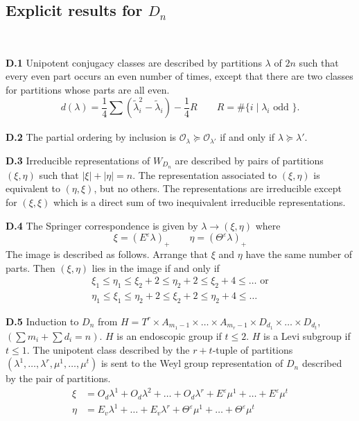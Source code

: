 \documentclass{amsart}
\newcommand\Amone[1]{A_{m_{#1}-1}}
\newcommand\eps	{\varepsilon}
\newcommand\lam	{\lambda}
\newcommand\lami	{\lam_i}
\newcommand\cO		{{\mathcal O}}
\newcommand\sumlam[1]{\sum_{#1} (\tilde\lam_i^2 - \tilde\lambda_i)}
\begin{document}

\bigskip
\subsection{Explicit results for $D_n$}~\newline

\bigskip

\noindent
{\bf D.1} \qquad Unipotent conjugacy classes are described by partitions $\lam$ of $2n$ such
that every even part occurs an even number of times, except that there are
two classes for partitions whose parts are all even.
	$$
	d(\lam) = \frac 14 \sumlam{} - \frac 14 R \qquad
	R = \#\{ i \mid \lami \text{ odd } \}.
	$$

\noindent
{\bf D.2} \qquad The partial ordering by inclusion is 
$\cO_\lam \succeq \cO_{\lam'}$ if and only if $\lam \succeq \lam'$.

\noindent
{\bf D.3} \qquad Irreducible representations of $W_{D_n}$ are described by pairs of partitions
$(\xi,\eta)$ such that $|\xi| + |\eta| = n$.  The representation associated
to $(\xi,\eta)$ is equivalent to $(\eta,\xi)$, but no others.  The
representations are irreducible except for $(\xi,\xi)$ which is a direct
sum of two inequivalent irreducible representations.

\noindent
{\bf D.4} \qquad The Springer correspondence is given by $\lam \to (\xi,\eta)$
where
	$$
	\xi = (E^\eps\lam)_+ \qquad
	\eta = (\Theta^\eps\lam)_+
	$$
The image is described as follows.  Arrange that
$\xi$ and $\eta$ have the same number of parts.  Then $(\xi,\eta)$ lies in the
image if and only if
	\begin{gather*}
	\xi_1 \le \eta_1 \le \xi_2+2 \le \eta_2+2 
		\le \xi_2+4 \le \dots \text{ or} \\
	\eta_1 \le \xi_1 \le \eta_2+2 \le \xi_2+2 \le \eta_2+4 \le \dots
	\end{gather*}

\noindent
{\bf D.5} \qquad Induction to $D_n$ from 
$H = T^r \times \Amone{1} \times\dots\times \Amone{r} \times
	D_{d_1} \times\dots\times D_{d_t}$, $(\sum m_i + \sum d_i = n)$.
$H$ is an endoscopic group if $t \le 2$.  $H$ is a Levi subgroup if 
$t \le 1$.  The unipotent class described by the $r+t$-tuple of partitions
$(\lam^1,\dots,\lam^r,\mu^1,\dots,\mu^t)$ is sent to the Weyl group
representation of $D_n$ described by the pair of partitions.
	\begin{align*}
	\xi &= O_d\lam^1 + O_d\lam^2 +\dots+ O_d\lam^r +
		E^\eps \mu^1 +\dots+ E^\eps \mu^t \\
	\eta &= E_v \lam^1 +\dots+ E_v \lam^r + \Theta^\eps \mu^1
		+\dots+ \Theta^\eps \mu^t
	\end{align*}
\end{document}
